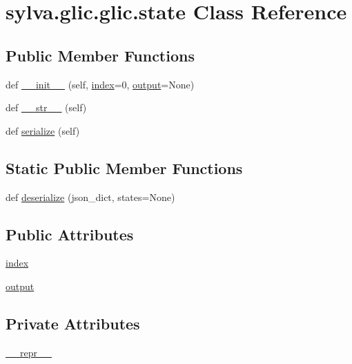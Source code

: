 \hypertarget{classsylva_1_1glic_1_1glic_1_1state}{}\section{sylva.\+glic.\+glic.\+state Class Reference}
\label{classsylva_1_1glic_1_1glic_1_1state}
\subsection*{Public Member Functions}
\begin{DoxyCompactItemize}
\item 
def \hyperlink{classsylva_1_1glic_1_1glic_1_1state_a0f4333a285db0815af061030147719bc}{\+\_\+\+\_\+init\+\_\+\+\_\+} (self, \hyperlink{classsylva_1_1glic_1_1glic_1_1state_aef7f98ba81db15cbdc2ee99fce22b24d}{index}=0, \hyperlink{classsylva_1_1glic_1_1glic_1_1state_a11784d5cf554e5ee8b96a15f516c8c7b}{output}=None)
\item 
def \hyperlink{classsylva_1_1glic_1_1glic_1_1state_ae76daa7ee7736520b44faadbe0cd0b39}{\+\_\+\+\_\+str\+\_\+\+\_\+} (self)
\item 
def \hyperlink{classsylva_1_1glic_1_1glic_1_1state_a09708ff3d56142db919a172a0cb849e1}{serialize} (self)
\end{DoxyCompactItemize}
\subsection*{Static Public Member Functions}
\begin{DoxyCompactItemize}
\item 
def \hyperlink{classsylva_1_1glic_1_1glic_1_1state_a00c5deb1533d0282be3a43587d483a2a}{deserialize} (json\+\_\+dict, states=None)
\end{DoxyCompactItemize}
\subsection*{Public Attributes}
\begin{DoxyCompactItemize}
\item 
\hyperlink{classsylva_1_1glic_1_1glic_1_1state_aef7f98ba81db15cbdc2ee99fce22b24d}{index}
\item 
\hyperlink{classsylva_1_1glic_1_1glic_1_1state_a11784d5cf554e5ee8b96a15f516c8c7b}{output}
\end{DoxyCompactItemize}
\subsection*{Private Attributes}
\begin{DoxyCompactItemize}
\item 
\hyperlink{classsylva_1_1glic_1_1glic_1_1state_a291b844e74d2968ce02a7d839c124d27}{\+\_\+\+\_\+repr\+\_\+\+\_\+}
\end{DoxyCompactItemize}



